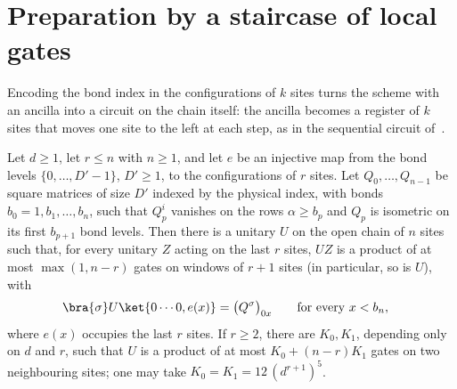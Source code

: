 \section{Preparation by a staircase of local gates}

Encoding the bond index in the configurations of $k$ sites turns the scheme
with an ancilla into a circuit on the chain itself: the ancilla becomes a
register of $k$ sites that moves one site to the left at each step, as in the
sequential circuit of~\cite[eq.~(14) and paragraph ``The sequential-RG
    circuit'']{Malz2024Preparation}.

\begin{lemma}
    \label{lem:seqanc_staircase}
    \leanok
    Let $d\ge1$, let $r\le n$ with $n\ge1$, and let $e$ be an injective map from the bond
    levels $\{0,\dots,D'-1\}$, $D'\ge1$, to the configurations of $r$ sites.
    Let $Q_0,\dots,Q_{n-1}$ be square matrices of size $D'$ indexed by the
    physical index, with bonds $b_0=1,b_1,\dots,b_n$, such that $Q_p^i$ vanishes
    on the rows $\alpha\ge b_p$ and $Q_p$ is isometric on its first $b_{p+1}$
    bond levels. Then there is a unitary $U$ on the open chain of $n$ sites
    such that, for every unitary $Z$ acting on the last $r$ sites, $UZ$ is a
    product of at most $\max(1,n-r)$ gates on windows of $r+1$ sites (in
    particular, so is $U$), with
    \begin{align}
        \bra{\sigma}U\ket{0\cdots0,e(x)} & =\bigl(Q^\sigma\bigr)_{0x}
        \qquad\text{for every } x<b_n,
        \label{eq:seqanc_staircase}
    \end{align}
    where $e(x)$ occupies the last $r$ sites. If $r\ge2$, there are $K_0,K_1$,
    depending only on $d$ and $r$, such that $U$ is a product of at most
    $K_0+(n-r)K_1$ gates on two neighbouring sites; one may take
    $K_0=K_1=12\,(d^{r+1})^5$.
\end{lemma}
